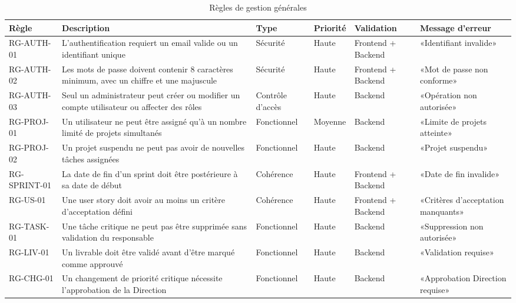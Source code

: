 \begin{table}[H]
\centering
\footnotesize
\begin{tabular}{|p{1.5cm}|p{3.5cm}|p{1.5cm}|p{1.5cm}|p{2cm}|p{2.5cm}|}
\hline
\textbf{Règle} & \textbf{Description} & \textbf{Type} & \textbf{Priorité} & \textbf{Validation} & \textbf{Message d'erreur} \\
\hline
RG-AUTH-01 & L'authentification requiert un email valide ou un identifiant unique & Sécurité & Haute & Frontend + Backend & «Identifiant invalide» \\
\hline
RG-AUTH-02 & Les mots de passe doivent contenir 8 caractères minimum, avec un chiffre et une majuscule & Sécurité & Haute & Frontend + Backend & «Mot de passe non conforme» \\
\hline
RG-AUTH-03 & Seul un administrateur peut créer ou modifier un compte utilisateur ou affecter des rôles & Contrôle d'accès & Haute & Backend & «Opération non autorisée» \\
\hline
RG-PROJ-01 & Un utilisateur ne peut être assigné qu'à un nombre limité de projets simultanés & Fonctionnel & Moyenne & Backend & «Limite de projets atteinte» \\
\hline
RG-PROJ-02 & Un projet suspendu ne peut pas avoir de nouvelles tâches assignées & Fonctionnel & Haute & Backend & «Projet suspendu» \\
\hline
RG-SPRINT-01 & La date de fin d'un sprint doit être postérieure à sa date de début & Cohérence & Haute & Frontend + Backend & «Date de fin invalide» \\
\hline
RG-US-01 & Une user story doit avoir au moins un critère d'acceptation défini & Cohérence & Haute & Frontend + Backend & «Critères d'acceptation manquants» \\
\hline
RG-TASK-01 & Une tâche critique ne peut pas être supprimée sans validation du responsable & Fonctionnel & Haute & Backend & «Suppression non autorisée» \\
\hline
RG-LIV-01 & Un livrable doit être validé avant d'être marqué comme approuvé & Fonctionnel & Haute & Backend & «Validation requise» \\
\hline
RG-CHG-01 & Un changement de priorité critique nécessite l'approbation de la Direction & Fonctionnel & Haute & Backend & «Approbation Direction requise» \\
\hline
\end{tabular}
\caption{Règles de gestion générales}
\label{tab:rg_generales}
\end{table}

